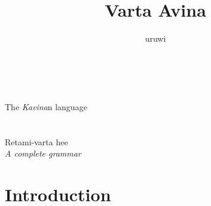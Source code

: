 \documentclass{book}
\title{Varta Avina}
\author{uruwi}
\newcommand{\hprule}{\noindent\makebox[\linewidth]{\rule{\paperwidth}{0.3pt}}}
\newcommand{\tsc}{\textsc}
\begin{document}
\pagecolor{ForestGreen!25}

\begin{titlepage}
    \makeatletter
    \begin{center}
        {\color{BlueGreen} \hprule \vspace{1.5ex} \\}
        {\huge\sffamily \textcolor{PineGreen}{\@title} \\}
        {\large The \textit{Kavina}n language \\}
        {\color{BlueGreen} \hprule \vspace{1.5ex} \\}
        \vspace{1.5cm}
        {\Large\bfseries \@author}\\[5pt]
        \vspace{2cm}
        {Retami-varta hee} \\[5pt]
        \emph{A complete grammar}\\[2cm]
        \vfill
        \vfill
        {\@date}
    \end{center}
    \makeatother
\end{titlepage}

\pagecolor{ForestGreen!15}

\tableofcontents

\section{Introduction}
\end{document}

